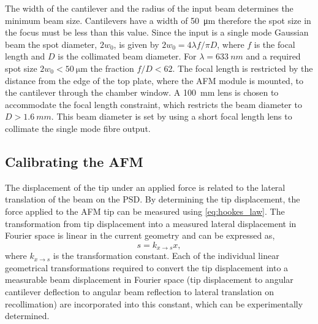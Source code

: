 \documentclass{article}
\begin{document}
The width of the cantilever and the radius of the input beam determines the minimum beam size. Cantilevers have a width of \SI{50}{\micro\metre} therefore the spot size in the focus must be less than this value. Since the input is a single mode Gaussian beam the spot diameter, $2w_0$, is given by $2w_0 = 4\lambda f/ \pi D$, where $f$ is the focal length and $D$ is the collimated beam diameter. For $\lambda=\SI{633}{nm}$ and a required spot size $2w_0 < \SI{50}{\micro\metre}$ the fraction $f/D < 62$. The focal length is restricted by the distance from the edge of the top plate, where the AFM module is mounted, to the cantilever through the chamber window. A \SI{100}{mm} lens is chosen to accommodate the focal length constraint, which restricts the beam diameter to $D > \SI{1.6}{mm}$. This beam diameter is set by using a short focal length lens to collimate the single mode fibre output.

\subsection{Calibrating the AFM}

The displacement of the tip under an applied force is related to the lateral translation of the beam on the PSD. By determining the tip displacement, the force applied to the AFM tip can be measured using \eqref{eq:hookes_law}. The transformation from tip displacement into a measured lateral displacement in Fourier space is linear in the current geometry and can be expressed as,
\begin{equation}
s = k_{x \rightarrow s}x,
\end{equation}
where $k_{x \rightarrow s}$ is the transformation constant. Each of the individual linear geometrical transformations required to convert the tip displacement into a measurable beam displacement in Fourier space (tip displacement to angular cantilever deflection to angular beam reflection to lateral translation on recollimation) are incorporated into this constant, which can be experimentally determined.
\end{document}
